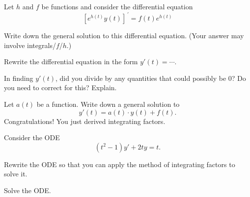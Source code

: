 \documentclass{workbook}
\begin{document}
\begin{slide}
	\question
	Let $h$ and $f$ be functions and consider the differential equation
	\[
	\left[e^{h(t)}y(t)\right]^{\,\prime} = f(t)e^{h(t)}
	\]

	\begin{parts}
		\item Write down the general solution to this differential equation. (Your answer may involve integrals/$f$/$h$.)

		\item Rewrite the differential equation in the form $y'(t)=\cdots$.
		\item In finding $y'(t)$, did you divide by any quantities that could possibly be $0$? Do you need to correct for this? Explain.
		\item Let $a(t)$ be a function. Write down a general solution to
		\[
			y'(t)=a(t)\cdot y(t)+f(t).
		\]
		Congratulations! You just derived integrating factors.
	\end{parts}
\end{slide}

\begin{slide}
	\question
	Consider the ODE
	\[
		(t^2-1)y'+2ty=t.
	\]

	\begin{parts}
		\item Rewrite the ODE so that you can apply the method of integrating factors to solve it.
		\item Solve the ODE.
	\end{parts}
\end{slide}
\end{document}
